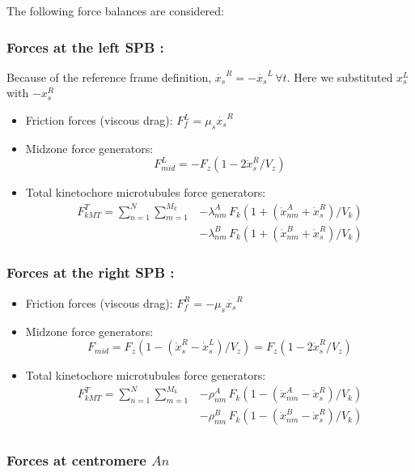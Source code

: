 \documentclass[a4paper,12pt]{article}
\begin{document}
The following force balances are considered:

\subsubsection{Forces at the left SPB :}

Because of the reference frame definition, $\dot{x_s}^R =
-\dot{x_s}^L\,\forall t$. Here we substituted $x_s^L$ with $-x_s^R$
\begin{itemize}
\item Friction forces (viscous drag):  $F_f^L = \mu_s \dot{x_s}^R$
\item Midzone force generators: 
  $$F_{mid}^L = - F_z\left(1 - 2\dot{x}^R_s / V_z\right) $$
\item Total kinetochore microtubules force generators:
$$  \begin{aligned}
    F_{kMT}^T = \sum_{n = 1}^{N}\sum_{m = 1}^{M_k} & - \lambda_{nm}^A\,F_k\left(1 +
      (\dot{x}^A_{nm} + \dot{x}^R_s)/V_k\right)\\
    & - \lambda_{nm}^B\,F_k\left(1 +
      (\dot{x}^B_{nm} + \dot{x}^R_s)/V_k\right)
  \end{aligned}
$$
\end{itemize}
\subsubsection{Forces at the right SPB :}

\begin{itemize}
\item Friction forces (viscous drag):  $F_f^R = -\mu_s \dot{x_s}^R$
\item Midzone force generators: 
  $$F_{mid} = F_z\left(1 - (\dot{x}^R_s - \dot{x}_s^L)/V_z\right) =
  F_z\left(1 - 2\dot{x}^R_s / V_z\right) $$
\item Total kinetochore microtubules force generators:
 $$ \begin{aligned}
    F_{kMT}^T = \sum_{n = 1}^{N}\sum_{m = 1}^{M_k} & - \rho_{nm}^A\,F_k\left( 1 -
      (\dot{x}^A_{nm} - \dot{x}^R_s)/V_k\right)\\
    & - \rho_{nm}^B\,F_k\left( 1 -
      (\dot{x}^B_{nm} - \dot{x}^R_s)/V_k\right)\\
 \end{aligned} $$
\end{itemize}

\subsubsection{Forces at centromere $An$}
\end{document}
